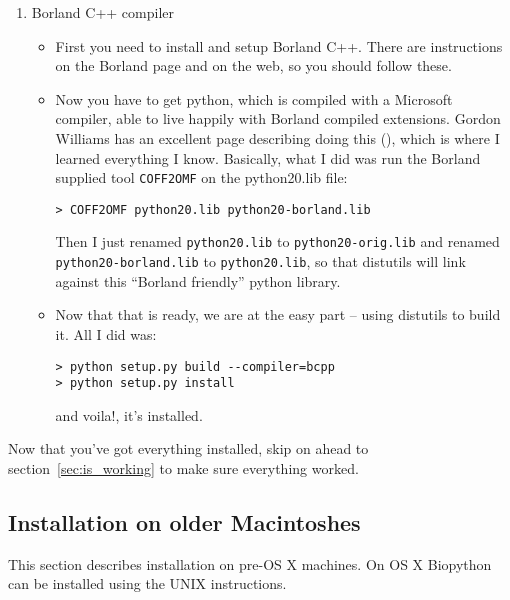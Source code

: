 \documentclass{article}
\begin{document}
\begin{enumerate}
  \item Borland C++ compiler

\begin{itemize}
  \item First you need to install and setup Borland C++. There are instructions on the Borland page and on the web, so you should follow these.
 
  \item Now you have to get python, which is compiled with a Microsoft compiler, able to live happily with Borland compiled extensions. Gordon Williams has an excellent page describing doing this (), which is where I learned everything I know. Basically, what I did was run the Borland supplied tool \verb|COFF2OMF| on the python20.lib file:

\begin{verbatim}
> COFF2OMF python20.lib python20-borland.lib
\end{verbatim}

Then I just renamed \verb|python20.lib| to \verb|python20-orig.lib| and renamed \verb|python20-borland.lib| to \verb|python20.lib|, so that distutils will link against this ``Borland friendly'' python library.

  \item Now that that is ready, we are at the easy part -- using distutils to build it. All I did was:

\begin{verbatim}
> python setup.py build --compiler=bcpp
> python setup.py install
\end{verbatim}

and voila!, it's installed. 

\end{itemize}

\end{enumerate}

Now that you've got everything installed, skip on ahead to section~\ref{sec:is_working} to make sure everything worked.

\subsection{Installation on older Macintoshes}

This section describes installation on pre-OS X machines. On OS X
Biopython can be installed using the UNIX instructions.
\end{document}
